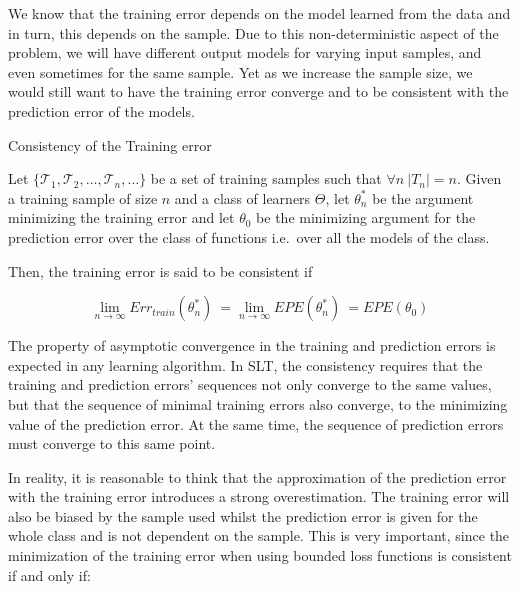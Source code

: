 We know that the training error depends on the model learned from the data and in turn, this depends on the sample. Due to this non-deterministic aspect of the problem, we will have different output models for varying input samples, and even sometimes for the same sample. Yet as we increase the sample size, we would still want to have the training error converge and to be consistent with the prediction error of the models.



\begin{definition}{Consistency of the Training error}

Let $\{\mathcal {T}_1, \mathcal {T}_2, \ldots, \mathcal {T}_n, \ldots \}$ be a set of training samples such that $\forall n \ |T_n|=n$. Given a training sample of size $n$ and a class of learners $\Theta$, let $\theta^{*}_n$ be the argument minimizing the training error and let $\theta_0$ be the minimizing argument for the prediction error over the class of functions i.e.\ over all the models of the class.

Then, the training error is said to be consistent if

\begin{equation}
\lim_{n\to\infty} Err_{train}(\theta^{*}_n) \ = \lim_{n\to\infty} EPE(\theta^{*}_n) \ = EPE(\theta_0)
\end{equation}

\end{definition}

The property of asymptotic convergence in the training and prediction errors is expected in any learning algorithm. In SLT, the consistency requires that the training and prediction errors' sequences not only converge to the same values, but that the sequence of minimal training errors also converge, to the minimizing value of the prediction error. At the same time, the sequence of prediction errors must converge to this same point.

In reality, it is reasonable to think that the approximation of the prediction error with the training error introduces a strong overestimation. The training error will also be biased by the sample used whilst the prediction error is given for the whole class and is not dependent on the sample. This is very important, since the minimization of the training error when using bounded loss functions is consistent if and only if:


